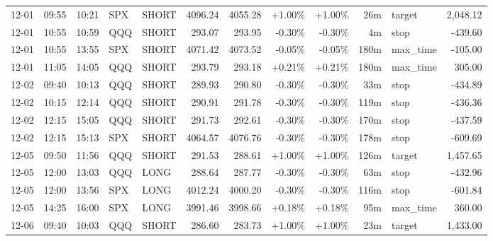 \documentclass[11pt,a4paper,twoside]{article}
\begin{document}
\begin{center}
\begin{longtable}{>{\color{txtmain}}l l l l l r r r r r >{\color{txtmain}}l r}
12-01 & 09:55 & 10:21 & SPX & SHORT & 4096.24 & 4055.28 & \textcolor{wingreen}{+1.00\%} & \textcolor{wingreen}{+1.00\%} & 26m & target & \textcolor{wingreen}{2,048.12} \\
12-01 & 10:55 & 10:59 & QQQ & SHORT & 293.07 & 293.95 & \textcolor{lossred}{-0.30\%} & \textcolor{lossred}{-0.30\%} & 4m & stop & \textcolor{lossred}{-439.60} \\
12-01 & 10:55 & 13:55 & SPX & SHORT & 4071.42 & 4073.52 & \textcolor{lossred}{-0.05\%} & \textcolor{lossred}{-0.05\%} & 180m & max\_time & \textcolor{lossred}{-105.00} \\
12-01 & 11:05 & 14:05 & QQQ & SHORT & 293.79 & 293.18 & \textcolor{wingreen}{+0.21\%} & \textcolor{wingreen}{+0.21\%} & 180m & max\_time & \textcolor{wingreen}{305.00} \\
12-02 & 09:40 & 10:13 & QQQ & SHORT & 289.93 & 290.80 & \textcolor{lossred}{-0.30\%} & \textcolor{lossred}{-0.30\%} & 33m & stop & \textcolor{lossred}{-434.89} \\
12-02 & 10:15 & 12:14 & QQQ & SHORT & 290.91 & 291.78 & \textcolor{lossred}{-0.30\%} & \textcolor{lossred}{-0.30\%} & 119m & stop & \textcolor{lossred}{-436.36} \\
12-02 & 12:15 & 15:05 & QQQ & SHORT & 291.73 & 292.61 & \textcolor{lossred}{-0.30\%} & \textcolor{lossred}{-0.30\%} & 170m & stop & \textcolor{lossred}{-437.59} \\
12-02 & 12:15 & 15:13 & SPX & SHORT & 4064.57 & 4076.76 & \textcolor{lossred}{-0.30\%} & \textcolor{lossred}{-0.30\%} & 178m & stop & \textcolor{lossred}{-609.69} \\
12-05 & 09:50 & 11:56 & QQQ & SHORT & 291.53 & 288.61 & \textcolor{wingreen}{+1.00\%} & \textcolor{wingreen}{+1.00\%} & 126m & target & \textcolor{wingreen}{1,457.65} \\
12-05 & 12:00 & 13:03 & QQQ & LONG & 288.64 & 287.77 & \textcolor{lossred}{-0.30\%} & \textcolor{lossred}{-0.30\%} & 63m & stop & \textcolor{lossred}{-432.96} \\
12-05 & 12:00 & 13:56 & SPX & LONG & 4012.24 & 4000.20 & \textcolor{lossred}{-0.30\%} & \textcolor{lossred}{-0.30\%} & 116m & stop & \textcolor{lossred}{-601.84} \\
12-05 & 14:25 & 16:00 & SPX & LONG & 3991.46 & 3998.66 & \textcolor{wingreen}{+0.18\%} & \textcolor{wingreen}{+0.18\%} & 95m & max\_time & \textcolor{wingreen}{360.00} \\
12-06 & 09:40 & 10:03 & QQQ & SHORT & 286.60 & 283.73 & \textcolor{wingreen}{+1.00\%} & \textcolor{wingreen}{+1.00\%} & 23m & target & \textcolor{wingreen}{1,433.00} \\

\end{longtable}
\end{center}
\end{document}
